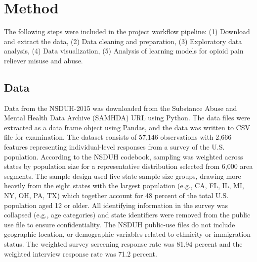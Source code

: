 \documentclass[sigconf]{acmart}
\begin{document}
\section{Method}

The following steps were included in the project workflow pipeline: 
(1) Download and extract the data, (2) Data cleaning and preparation, 
(3) Exploratory data analysis, (4) Data visualization, (5) Analysis of 
learning models for opioid pain reliever misuse and abuse.

\subsection{Data} 



Data from the NSDUH-2015 was downloaded from the Substance Abuse and Mental 
Health Data Archive (SAMHDA) 
\cite{samhsa16} URL using Python. The data files were extracted as a data 
frame object using Pandas, and the data was written to CSV file for 
examination. The dataset consists of 57,146 observations with 2,666 features 
representing individual-level responses from a survey of the U.S. population. 
According to the NSDUH codebook, sampling was weighted across states by 
population size for a representative distribution selected from 6,000 area 
segments. The sample design used five state sample size groups, drawing more 
heavily from the eight states with the largest population (e.g., CA, FL, IL, 
MI, NY, OH, PA, TX) which together account for 48 percent of the total U.S. 
population aged 12 or older.  All identifying information in the survey was
collapsed (e.g., age categories) and state identifiers were removed from the 
public use file to ensure confidentiality. The NSDUH public-use files do not 
include geographic location, or demographic variables related to ethnicity or 
immigration status. The weighted survey screening response rate was 81.94 
percent and the weighted interview response rate was 71.2 percent. 
\end{document}
